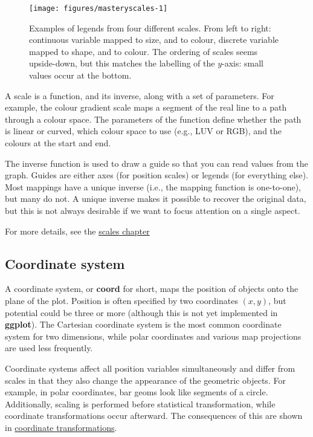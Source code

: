 \begin{figure}

{\centering \texttt{[image: figures/masteryscales-1]} 

}

\caption{Examples of legends from four different scales. From left to right: continuous variable mapped to size, and to colour, discrete variable mapped to shape, and to colour. The ordering of scales seems upside-down, but this matches the labelling of the $y$-axis: small values occur at the bottom.\label{fig:scales}}
\end{figure}

A scale is a function, and its inverse, along with a set of parameters.
For example, the colour gradient scale maps a segment of the real line
to a path through a colour space. The parameters of the function define
whether the path is linear or curved, which colour space to use (e.g.,
LUV or RGB), and the colours at the start and end.

The inverse function is used to draw a guide so that you can read values
from the graph. Guides are either axes (for position scales) or legends
(for everything else). Most mappings have a unique inverse (i.e., the
mapping function is one-to-one), but many do not. A unique inverse makes
it possible to recover the original data, but this is not always
desirable if we want to focus attention on a single aspect.

For more details, see the \hyperref[cha:scales]{scales chapter}

\subsection{Coordinate system}\label{sub:coordinate-systems}

A coordinate system, or \textbf{coord} for short, maps the position of
objects onto the plane of the plot. Position is often specified by two
coordinates \((x, y)\), but potential could be three or more (although
this is not yet implemented in \textbf{ggplot}). The Cartesian
coordinate system is the most common coordinate system for two
dimensions, while polar coordinates and various map projections are used
less frequently. 

Coordinate systems affect all position variables simultaneously and
differ from scales in that they also change the appearance of the
geometric objects. For example, in polar coordinates, bar geoms look
like segments of a circle. Additionally, scaling is performed before
statistical transformation, while coordinate transformations occur
afterward. The consequences of this are shown in
\hyperref[sub:coord-transformation]{coordinate transformations}.

